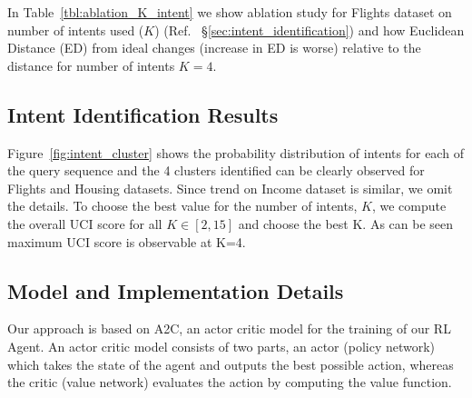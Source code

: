 \begin{table}[]
\caption{Ablation study: Variation of K or \# of intents (Ref ~\S{\ref{sec:intent_identification}})}
\label{tbl:ablation_K_intent}
\end{table}

In Table~\ref{tbl:ablation_K_intent} we show ablation study for Flights dataset on number of intents used ($K$) (Ref. ~\S{\ref{sec:intent_identification}}) and how Euclidean Distance (ED) from ideal changes (increase in ED is worse) relative to the distance for number of intents $K=4.$



\subsection{Intent Identification Results} 
\label{apps:intent_identification}


Figure~\ref{fig:intent_cluster} shows the probability distribution of intents for each of the query sequence and the 4 clusters identified can be clearly observed for Flights and Housing datasets. 
Since trend on Income dataset is similar, we omit the details.
To choose the best value for the number of intents, $K$, we compute the overall UCI score for all $K \in [2,15]$ and choose the best K. As can be seen maximum UCI score is observable at K=4.

\subsection{Model and Implementation Details}
\label{apps:model_implementation}
Our approach is based on A2C, an actor critic model for the training of our RL Agent. An actor critic model consists of two parts, an actor (policy network) which takes the state of the agent and outputs the best possible action, whereas the critic (value network) evaluates the action by computing the value function. %

